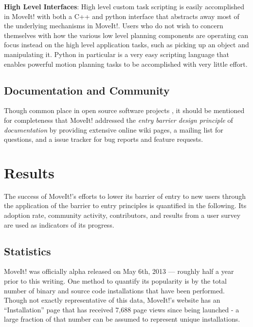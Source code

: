 \documentclass[10pt,journal,compsoc]{joser1}
\begin{document}
{{\bf High Level Interfaces}: High level custom task scripting is easily
accomplished in MoveIt! with both a C++ and python interface that abstracts away
most of the underlying mechanisms in MoveIt!. Users who do not wish to concern
themselves with how the various low level planning components are operating can
focus instead on the high level application tasks, such as picking up an object
and manipulating it. Python in particular is a very easy scripting language that
enables powerful motion planning tasks to be accomplished with very little
effort.

\subsection{Documentation and Community}

Though common place in open source software projects \cite{bruyninckx2001open},
it should be mentioned for completeness that MoveIt! addressed the \textit{entry
barrier design principle} of \textit{documentation} by providing extensive
online wiki pages, a mailing list for questions, and a issue tracker for bug
reports and feature requests.

\section{Results}
\label{sec::results}

The success of MoveIt!'s efforts to lower its barrier of entry to new users
through the application of the barrier to entry principles is quantified in the
following. Its adoption rate, community activity, contributors, and results from
a user survey are used as indicators of its progress.

\subsection{Statistics}
\label{sec::statistics}

MoveIt! was officially alpha released on May 6th, 2013 --- roughly half a year
prior to this writing. One method to quantify its popularity is by the total
number of binary and source code installations that have been performed. Though
not exactly representative of this data, MoveIt!'s website has an
``Installation'' page that has received 7,688 page views since being launched
\cite{moveit} - a large fraction of that number can be assumed to represent
unique installations. 

}
\end{document}

